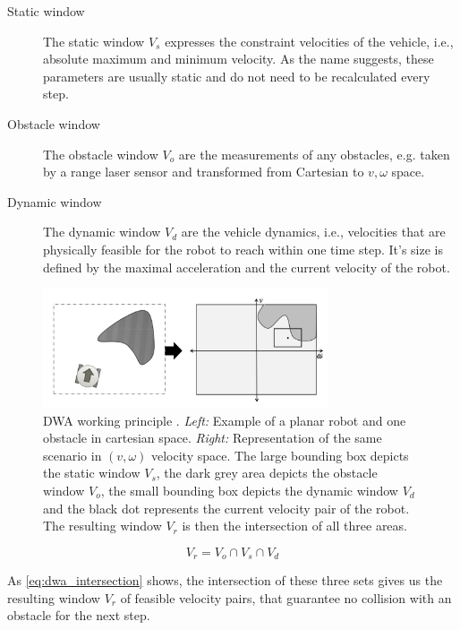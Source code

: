 \begin{description}
\item[Static window] The static window $V_s$ expresses the constraint velocities of the vehicle, i.e., absolute maximum and minimum velocity. As the name suggests, these parameters are usually static and do not need to be recalculated every step.

\item[Obstacle window] The obstacle window $V_o$ are the measurements of any obstacles, e.g. taken by a range laser sensor and transformed from Cartesian to $v,\omega$ space.

\item[Dynamic window]The dynamic window $V_d$ are the vehicle dynamics, i.e., velocities that are physically feasible for the robot to reach within one time step. It's size is defined by the maximal acceleration and the current velocity of the robot.
\end{description}

\begin{figure}[h]
   \centering
   \includegraphics[width=0.75\textwidth]{images/dwa.png}
   \caption{DWA working principle \citep{siegwart2004autonomous}. \emph{Left:} Example of a planar robot and one obstacle in cartesian space. \emph{Right:} Representation of the same scenario in $(v,\omega)$ velocity space. The large bounding box depicts the static window $V_s$, the dark grey area depicts the obstacle window $V_o$, the small bounding box depicts the dynamic window $V_d$ and the black dot represents the current velocity pair of the robot. The resulting window $V_r$ is then the intersection of all three areas.}
   \label{pics:dwa}
\end{figure}

\begin{equation}
V_r = V_o \cap V_s \cap V_d
 	\label{eq:dwa_intersection}
\end{equation}

As \cref{eq:dwa_intersection} shows, the intersection of these three sets gives us the resulting window $V_r$ of feasible velocity pairs, that guarantee no collision with an obstacle for the next step.

